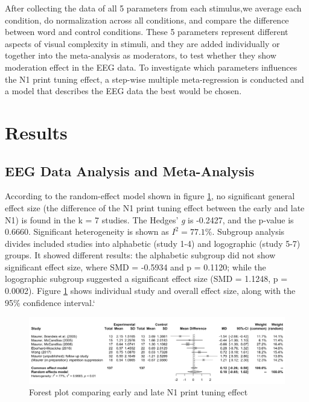 \documentclass{article}
\begin{document}
After collecting the data of all 5 parameters from each stimulus,we average each condition, do normalization across all conditions, and compare the difference between word and control conditions. These 5 parameters represent different aspects of visual complexity in stimuli, and they are added individually or together into the meta-analysis as moderators, to test whether they show moderation effect in the EEG data. To investigate which parameters influences the N1 print tuning effect, a step-wise multiple meta-regression is conducted and a model that describes the EEG data the best would be chosen.

\section{Results}
\subsection{EEG Data Analysis and Meta-Analysis}

According to the random-effect model shown in figure \ref{fig:forest plot 1}, no significant general effect size (the difference of the N1 print tuning effect between the early and late N1) is found in the k = 7 studies. The Hedges’ \textit{g} is -0.2427, and the p-value is 0.6660. Significant heterogeneity is shown as \begin{math}I^2 = 77.1\%\end{math}. Subgroup analysis divides included studies into alphabetic (study 1-4) and logographic (study 5-7) groups. It showed different results: the alphabetic subgroup did not show significant effect size, where SMD = -0.5934 and p = 0.1120; while the logographic subgroup suggested a significant effect size (SMD = 1.1248, p = 0.0002). Figure \ref{fig:forest plot 1} shows individual study and overall effect size, along with the 95\% confidence interval.`

\begin{figure}[h!]
  \includegraphics[scale = 0.368]{early_late_N1_PTE.png}
  \caption{Forest plot comparing early and late N1 print tuning effect}
  \label{fig:forest plot 1}
\end{figure}
\end{document}
